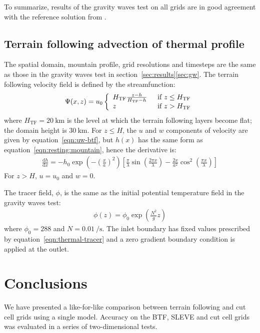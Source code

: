 \documentclass[draft]{ametsoc}
\begin{document}
To summarize, results of the gravity waves test on all grids are in good agreement with the reference solution from \citet{melvin2010}.

\subsection{Terrain following advection of thermal profile}
The spatial domain, mountain profile, grid resolutions and timesteps are the same as those in the gravity waves test in section~\ref{sec:results}\ref{sec:gw}.  The terrain following velocity field is defined by the streamfunction:
\begin{align}
	\Psi(x,z) = u_0 \left\{ \begin{array}{l l}
			H_\mathrm{TF} \frac{z - h}{H_\mathrm{TF} - h} \label{eqn:streamfunc-btf} & \enskip \text{if $z \leq H_\mathrm{TF}$} \\
			z & \enskip \text{if $z > H_\mathrm{TF}$}
	\end{array} \right.
\end{align}
where \(H_\mathrm{TF} = \SI{20}{\kilo\meter}\) is the level at which the terrain following layers become flat; the domain height is \(\SI{30}{\kilo\meter}\).
For $z \leq H$, the $u$ and $w$ components of velocity are given by equation~\ref{eqn:uw-btf}, but $h(x)$ has the same form as equation~\ref{eqn:resting:mountain}, hence the derivative is:
\begin{align}
	\frac{\mathrm{d} h}{\mathrm{d} x} = -h_0 \exp \left(- \left( \frac{x}{a} \right)^2 \right) \left[ \frac{\pi}{\lambda} \sin \left( \frac{2 \pi x}{\lambda} \right) - \frac{2x}{a^2} \cos^2\left( \frac{\pi x}{\lambda} \right) \right]
\end{align}
For $z > H$, $u = u_0$ and $w = 0$.

The tracer field, \(\phi\), is the same as the initial potential temperature field in the gravity waves test:
\begin{align}
	\phi(z) = \phi_0 \exp \left( \frac{N^2}{g} z \right) \label{eqn:thermal-tracer}
\end{align}
where \(\phi_0 = 288\) and \(N = \SI{0.01}{\per\second}\).  The inlet boundary has fixed values prescribed by equation~\ref{eqn:thermal-tracer} and a zero gradient boundary condition is applied at the outlet.

\section{Conclusions}
We have presented a like-for-like comparison between terrain following and cut cell grids using a single model.  Accuracy on the BTF, SLEVE and cut cell grids was evaluated in a series of two-dimensional tests.
\end{document}
